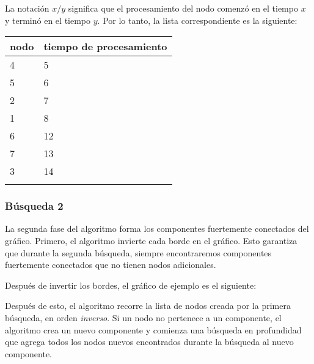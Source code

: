 La notación $x/y$ significa que
el procesamiento del nodo comenzó
en el tiempo $x$ y terminó en el tiempo $y$.
Por lo tanto, la lista correspondiente es la siguiente:

\begin{tabular}{ll}
\\
nodo & tiempo de procesamiento \\
\hline
4 & 5 \\
5 & 6 \\
2 & 7 \\
1 & 8 \\
6 & 12 \\
7 & 13 \\
3 & 14 \\
\\
\end{tabular}
% 

\subsubsection{Búsqueda 2}

La segunda fase del algoritmo
forma los componentes fuertemente conectados
del gráfico.
Primero, el algoritmo invierte cada
borde en el gráfico.
Esto garantiza que durante la segunda búsqueda,
siempre encontraremos componentes fuertemente conectados
que no tienen nodos adicionales.

Después de invertir los bordes,
el gráfico de ejemplo es el siguiente:
\begin{center}
\end{center}

Después de esto, el algoritmo recorre
la lista de nodos creada por la primera búsqueda,
en orden \emph{inverso}.
Si un nodo no pertenece a un componente,
el algoritmo crea un nuevo componente
y comienza una búsqueda en profundidad
que agrega todos los nodos nuevos encontrados durante la búsqueda
al nuevo componente.

